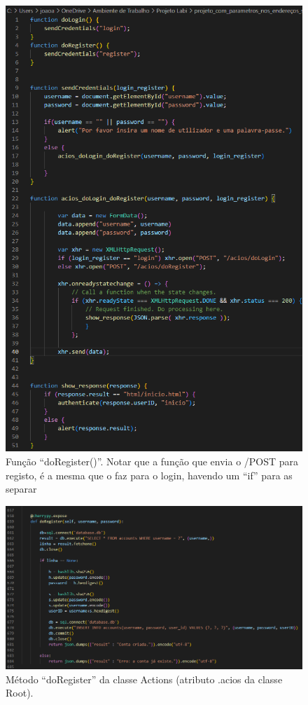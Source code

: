 \documentclass{report}
\begin{document}
\begin{figure}[!hbtp]

        \includegraphics[scale=0.60]{Images_code/5 - js login.png}
        \caption{\label{Estrutura}Função “doRegister()”. Notar que a função que envia o /POST para registo, é a mesma que o faz para o login, havendo um “if” para as separar}
\end{figure}

\begin{figure}[!hbtp]

        \includegraphics[scale=0.50]{Images_code/6 - app - doRegister.png}
        \caption{\label{Estrutura}Método “doRegister” da classe Actions (atributo .acios da classe Root).}
\end{figure}
\end{document}
